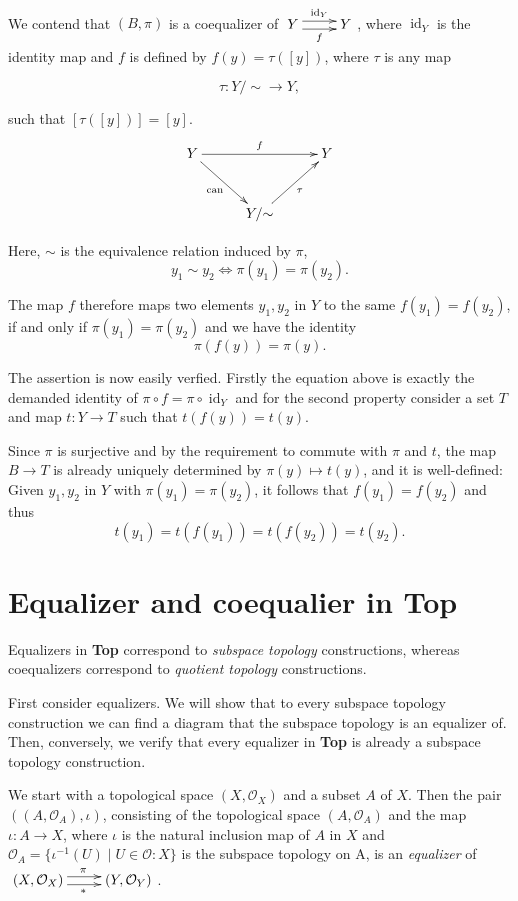 \documentclass[a4paper]{amsart}            %
\makeatletter
\renewcommand{\O}{\mathcal{O}}
\newcommand{\id}{\operatorname{id}}
\renewenvironment{proof}[1][\proofname]{\par
  \pushQED{\qed}%
  \normalfont \topsep6\p@\@plus6\p@\relax
  \trivlist
  \leftskip=0.6cm
  
  \item[\hskip\labelsep
        \itshape
    #1\@addpunct{.}]\mbox{ }\par\noindent%
  \leftskip=1cm
  \rightskip=1cm    
}{%
  \popQED\endtrivlist\@endpefalse
}
\theoremstyle{plain}                                               %
\makeatother
\begin{document}
\begin{proof}
We contend that $(B,\pi)$ is a coequalizer of $\xymatrix{Y \ar@<0.66ex>[r]^-{\id_Y} \ar@<-0.66ex>[r]_-{f} &Y}$, where $\id_Y$ is the identity map and $f$ is defined by $f(y)=\tau([y])$, where $\tau$ is any map 

\[
\tau: Y/{\sim} \to Y,
\]

 such that $[\tau([y])]=[y]$. 
\begin{align*}
\xymatrix@+=1cm{Y  \ar[rr]^{f} \ar[rd]_{\operatorname{can}} & & Y\\
								&	 Y/{\sim} \ar[ur]_{\tau}  &}
\end{align*}

Here, $\sim$ is the equivalence relation induced by $\pi$, 
\[y_1 \sim y_2 \Leftrightarrow \pi(y_1)=\pi(y_2).\]

The map $f$ therefore maps two elements $y_1,y_2$ in $Y$ to the same $f(y_1)=f(y_2)$, if and only if $\pi(y_1)=\pi(y_2)$ and we have the identity 
\[\pi(f(y))=\pi(y).\]

The assertion is now easily verfied. Firstly the equation above is exactly the demanded identity of $\pi \circ f = \pi \circ \id_Y$ and for the second property consider a set $T$ and map $t: Y \to T$ such that $t(f(y))=t(y)$. 

Since $\pi$ is surjective and by the requirement to commute with $\pi$ and $t$, the map $B \to T$ is already uniquely determined by $\pi(y) \mapsto t(y)$, and it is well-defined: Given $y_1,y_2$ in $Y$ with $\pi(y_1)=\pi(y_2)$, it follows that $f(y_1)=f(y_2)$ and thus 
\[t(y_1)=t(f(y_1))=t(f(y_2))=t(y_2).\]\end{proof}

\section*{\textbf{Equalizer and coequalier in Top}}


Equalizers in \textbf{Top} correspond to \emph{subspace topology} constructions, whereas coequalizers correspond to \emph{quotient topology} constructions.

First consider equalizers. We will show that to every subspace topology construction we can find a diagram that the subspace topology is an equalizer of. Then, conversely, we verify that every equalizer in \textbf{Top} is already a subspace topology construction.

We start with a topological space $(X, \O_X)$ and a subset $A$ of $X$. Then the pair $((A, \O_A), \iota)$, consisting of the topological space $(A, \O_A)$ and the map $\iota: A \rightarrow X$, where $\iota$ is the natural inclusion map of $A$ in $X$ and $\O_A=\{\iota^{-1}(U) \mid U \in \O:X \}$ is the subspace topology on A, is an \emph{equalizer} of $\xymatrix{(X,\O_X) \ar@<0.66ex>[r]^{\pi} \ar@<-0.66ex>[r]_{\ast} &(Y,\O_Y)}$.
\end{document}
